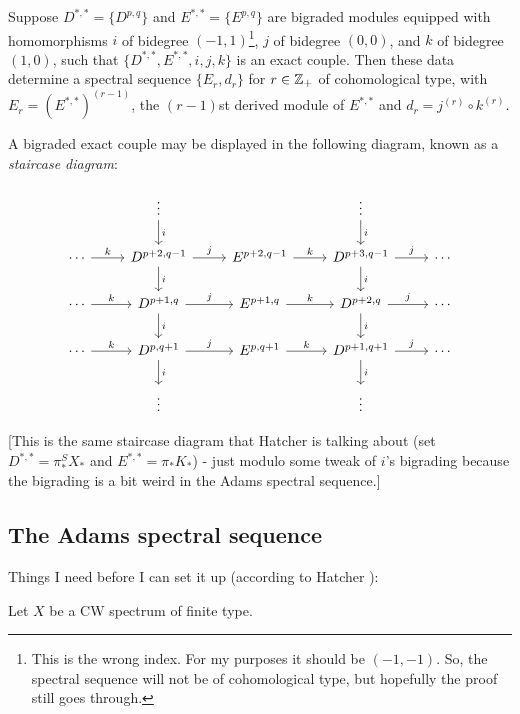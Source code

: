\documentclass{MetricNotes2023}
\def\inte{\ensuremath\mathbb{Z}}
\begin{document}
\begin{theorem}
Suppose \(D^{*,*}=\{D^{p,q}\}\) and \(E^{*,*}=\{E^{p,q}\}\) are bigraded modules equipped with homomorphisms \(i\) of bidegree \((-1,1)\)\footnote{This is the wrong index. For my purposes it should be \((-1, -1)\). So, the spectral sequence will not be of cohomological type, but hopefully the proof still goes through.}, \(j\) of bidegree \((0,0)\), and \(k\) of bidegree \((1,0)\), such that \(\{D^{*,*}, E^{*,*}, i, j, k\}\) is an exact couple. Then these data determine a spectral sequence \(\{E_r, d_r\}\) for \(r\in \inte_+\) of cohomological type, with \(E_r=(E^{*,*})^{(r-1)}\), the \((r-1)\)st derived module of \(E^{*,*}\) and \(d_r=j^{(r)}\circ k^{(r)}\). 
\end{theorem}

A bigraded exact couple may be displayed in the following diagram, known as a \textit{staircase diagram}:

\[\begin{tikzcd} 
   &  \vdots \arrow[d, "i"] &  & \vdots \arrow[d, "i"] & \\
 \cdots \arrow[r, "k"] & D^{p+2, q-1} \arrow[d, "i"] \arrow[r, "j"] & E^{p+2,q-1}  \arrow[r, "k"] & D^{p+3,q-1} \arrow[d, "i"] \arrow[r, "j"] & \cdots \\
 \cdots \arrow[r, "k"] & D^{p+1,q} \arrow[d, "i"] \arrow[r, "j"] & E^{p+1,q}  \arrow[r, "k"] & D^{p+2,q} \arrow[d, "i"] \arrow[r, "j"] & \cdots \\
 \cdots \arrow[r, "k"] & D^{p,q+1}  \arrow[d, "i"] \arrow[r, "j"] & E^{p,q+1}  \arrow[r, "k"] & D^{p+1,q+1} \arrow[d, "i"] \arrow[r, "j"] & \cdots \\
 & \vdots &  & \vdots & 
\end{tikzcd}\]

[This is the same staircase diagram that Hatcher is talking about (set \(D^{*,*}=\pi_*^SX_*\) and \(E^{*,*}=\pi_*K_*\)) - just modulo some tweak of \(i\)'s bigrading because the bigrading is a bit weird in the Adams spectral sequence.]

\subsection{The Adams spectral sequence}

Things I need before I can set it up (according to Hatcher \autocite{hatcher5}):

Let \(X\) be a CW spectrum of finite type.
\end{document}

